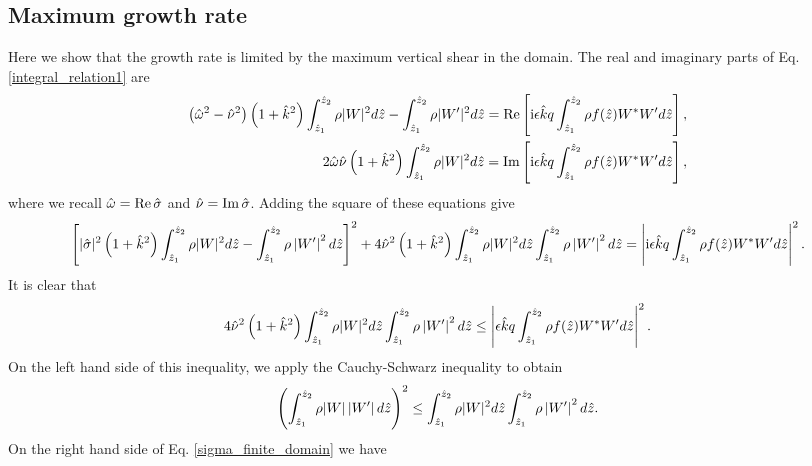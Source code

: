 \subsection{Maximum growth rate}   
Here we show that the growth rate is limited by the maximum vertical
shear in the domain. %
The real and imaginary parts of 
Eq. \ref{integral_relation1} are
\begin{align}
  \left(\hat{\omega}^2-\hat{\nu}^2\right)\left(1+\hat{k}^2\right)
  \int_{\hat{z}_1}^{\hat{z}_2}\rho|W|^2d\hat{z} -
  \int_{\hat{z}_1}^{\hat{z}_2}\rho|W^\prime|^2d\hat{z}
  \notag
  =\operatorname{Re}\left[\mathrm{i}
    \epsilon\hat{k}q \int_{\hat{z}_1}^{\hat{z}_2}\rho
    f(\hat{z}) W^*W^\prime d\hat{z}\right], \\
   2\hat{\omega}\hat{\nu}\left(1+\hat{k}^2\right)
  \int_{\hat{z}_1}^{\hat{z}_2}\rho|W|^2d\hat{z}
  =\operatorname{Im}\left[\mathrm{i}
    \epsilon\hat{k}q \int_{\hat{z}_1}^{\hat{z}_2}\rho
    f(\hat{z}) W^*W^\prime d\hat{z}\right],
\end{align}
where we recall $\hat{\omega} = \operatorname{Re} \hat{\sigma}$ and
$\hat{\nu}=\operatorname{Im}\hat{\sigma}$. 
Adding the square of these equations give
\begin{align}
  \left[|\hat{\sigma}|^2\left(1+\hat{k}^2\right)
    \int_{\hat{z}_1}^{\hat{z}_2}\rho|W|^2d\hat{z} -
    \int_{\hat{z}_1}^{\hat{z}_2}\rho\left|W^\prime \right|^2d\hat{z}\right]^2
  +4\hat{\nu}^2\left(1+\hat{k}^2\right) 
  \int_{\hat{z}_1}^{\hat{z}_2}\rho
  |W|^2d\hat{z}\int_{\hat{z}_1}^{\hat{z}_2}\rho\left|W^\prime \right|^2d\hat{z}
  =\left|\mathrm{i}
    \epsilon\hat{k}q\int_{\hat{z}_1}^{\hat{z}_2}\rho
    f(\hat{z}) W^*W^\prime d\hat{z}\right|^2.
\end{align}
It is clear that
\begin{align}\label{sigma_finite_domain} 
  4\hat{\nu}^2\left(1+\hat{k}^2\right) 
  \int_{\hat{z}_1}^{\hat{z}_2}\rho
  |W|^2d\hat{z}\int_{\hat{z}_1}^{\hat{z}_2}\rho\left|W^\prime
  \right|^2d\hat{z} 
  \leq\left|
    \epsilon\hat{k}q\int_{\hat{z}_1}^{\hat{z}_2}\rho
    f(\hat{z}) W^*W^\prime d\hat{z}\right|^2.
\end{align}
On the left hand side of this inequality, we apply the Cauchy-Schwarz
inequality to obtain
\begin{align}
  \left( \int_{\hat{z}_1}^{\hat{z}_2}\rho
    |W|\left|W^\prime \right|d\hat{z}\right)^2\leq
  \int_{\hat{z}_1}^{\hat{z}_2}\rho 
  |W|^2d\hat{z}\int_{\hat{z}_1}^{\hat{z}_2}\rho\left|W^\prime \right|^2d\hat{z}.
\end{align}
On the right hand side of Eq. \ref{sigma_finite_domain} we have
